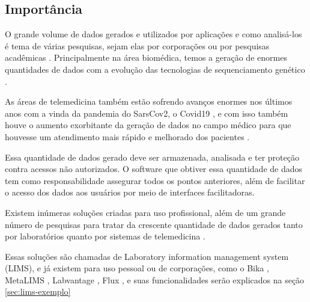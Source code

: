 \subsection{Importância}


O grande volume de dados gerados e utilizados por aplicações e como analisá-los é tema de várias pesquisas, sejam elas por corporações ou por pesquisas acadêmicas \R. Principalmente na área biomédica, temos a geração de enormes quantidades de dados com a evolução das tecnologias de sequenciamento genético \cite{luoJ2016}.

As áreas de telemedicina também estão sofrendo avanços enormes nos últimos anos com a vinda da pandemia do SarsCov2, o Covid19 \cite{bakhtiar2020, kronenfeld2021, GatesB.Colbert2020UtilityEra}, e com isso também houve o aumento exorbitante da geração de dados no campo médico para que houvesse um atendimento mais rápido e melhorado dos pacientes \cite{MohdKhanapiAbdGhani2018PDFData, Coakley2015TransformingAnalytics}.

Essa quantidade de dados gerado deve ser armazenada, analisada e ter proteção contra acessos não autorizados. O software que obtiver essa quantidade de dados tem como responsabilidade assegurar todos os pontos anteriores, além de facilitar o acesso dos dados aos usuários por meio de interfaces facilitadoras.

Existem inúmeras soluções criadas para uso profissional, além de um grande número de pesquisas para tratar da crescente quantidade de dados gerados tanto por laboratórios quanto por sistemas de telemedicina \cite{Mangrulkar2022AutomaticTechniques}.

Essas soluções são chamadas de Laboratory information management system (LIMS), e já existem para uso pessoal ou de corporações, como o Bika \cite{Goodblatt2006FosteringProcess}, MetaLIMS \cite{Heinle2017MetaLIMSLabs}, Labvantage \cite{Smallmon2017BiobankingSilos}, Flux \cite{Melo2010SIGLa:Laboratories}, e suas funcionalidades serão explicados na seção \ref{sec:lims-exemplo}


